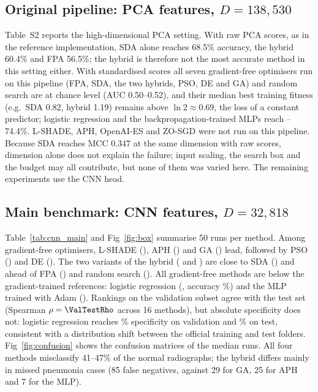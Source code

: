 \documentclass[preprint,12pt]{elsarticle}
\begin{document}
\subsection{Original pipeline: PCA features, \texorpdfstring{$D=138{,}530$}{D = 138,530}}\label{sec:pca}
Table~S2 reports the high-dimensional PCA setting. With raw PCA scores, as in the reference implementation, SDA alone reaches 68.5\% accuracy, the hybrid 60.4\% and FPA 56.5\%; the hybrid is therefore not the most accurate method in this setting either. With standardised scores all seven gradient-free optimisers run on this pipeline (FPA, SDA, the two hybrids, PSO, DE and GA) and random search are at chance level (AUC 0.50--0.52), and their median best training fitness (e.g.\ SDA 0.82, hybrid 1.19) remains above $\ln 2\approx0.69$, the loss of a constant predictor; logistic regression and the backpropagation-trained MLPs reach \MlpSgdPcaAcc--74.4\%. L-SHADE, APH, OpenAI-ES and ZO-SGD were not run on this pipeline. Because SDA reaches MCC 0.347 at the same dimension with raw scores, dimension alone does not explain the failure; input scaling, the search box and the budget may all contribute, but none of them was varied here. The remaining experiments use the CNN head.


\subsection{Main benchmark: CNN features, \texorpdfstring{$D=32{,}818$}{D = 32,818}}
Table~\ref{tab:cnn_main} and Fig~\ref{fig:box} summarise 50 runs per method. Among gradient-free optimisers, L-SHADE (\MCCLShade), APH (\MCCAph) and GA (\MCCGa) lead, followed by PSO (\MCCPso) and DE (\MCCDe). The two variants of the hybrid (\MCCHybrid{} and \MCCHybridReinit) are close to SDA (\MCCSda) and ahead of FPA (\MCCFpa) and random search (\MCCRandom). All gradient-free methods are below the gradient-trained references: logistic regression (\MCCLogreg, accuracy \ACCLogreg\%) and the MLP trained with Adam (\MCCMlpAdam). Rankings on the validation subset agree with the test set (Spearman $\rho=\ValTestRho$ across 16 methods), but absolute specificity does not: logistic regression reaches \LRValSpec\% specificity on validation and \LRTestSpec\% on test, consistent with a distribution shift between the official training and test folders. Fig~\ref{fig:confusion} shows the confusion matrices of the median runs. All four methods misclassify 41--47\% of the normal radiographs; the hybrid differs mainly in missed pneumonia cases (85 false negatives, against 29 for GA, 25 for APH and 7 for the MLP).
\end{document}
